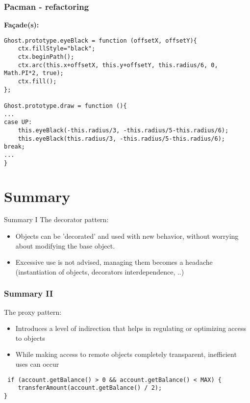 \documentclass{beamer}
\begin{document}
\begin{frame}[fragile]
\frametitle{Pacman - refactoring}
\textbf{Fa\c{c}ade(s):}
\begin{lstlisting}
Ghost.prototype.eyeBlack = function (offsetX, offsetY){
	ctx.fillStyle="black";
	ctx.beginPath();
	ctx.arc(this.x+offsetX, this.y+offsetY, this.radius/6, 0, Math.PI*2, true); 
	ctx.fill();
};

Ghost.prototype.draw = function (){
...
case UP:
	this.eyeBlack(-this.radius/3, -this.radius/5-this.radius/6);
	this.eyeBlack(this.radius/3, -this.radius/5-this.radius/6);
break;
...
}
\end{lstlisting}
\end{frame}



\section*{Summary}
\begin{frame}{Summary I}
 The decorator pattern:
 \begin{itemize}
\item Objects can be 'decorated' and used with new behavior, without worrying about modifying the base object.
\item Excessive use is not advised, managing them becomes a headache (instantiation of objects, decorators interdependence, ..) 
 \end{itemize}
\end{frame}

\begin{frame}[fragile]
\frametitle{Summary II}
 The proxy pattern:
 \begin{itemize}
\item Introduces a level of indirection that helps in regulating or optimizing access to objects
\item While making access to remote objects completely transparent, inefficient uses can occur
 \end{itemize}
 \begin{lstlisting}
 if (account.getBalance() > 0 && account.getBalance() < MAX) {
    transferAmount(account.getBalance() / 2);
}
 \end{lstlisting}
\end{frame}
\end{document}
